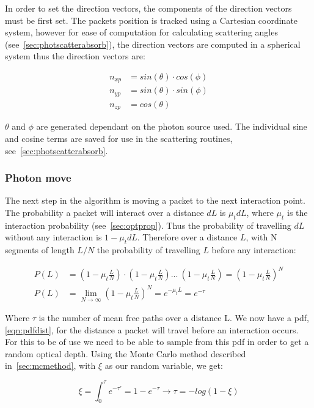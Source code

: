 In order to set the direction vectors, the components of the direction vectors must be first set. The packets position is tracked using a Cartesian coordinate system, however for ease of computation for calculating scattering angles (see~\cref{sec:photscatterabsorb}), the direction vectors are computed in a spherical system thus the direction vectors are: 

\begin{align}
n_{xp} &= sin(\theta) \cdot cos(\phi) \\
n_{yp} &= sin(\theta) \cdot sin(\phi) \\
n_{zp} &= cos(\theta)
\end{align}

$\theta$ and $\phi$ are generated dependant on the photon source used. The individual sine and cosine terms are saved for use in the scattering routines, see~\cref{sec:photscatterabsorb}.

\subsubsection{Photon move}\label{sec:photmove}

The next step in the algorithm is moving a packet to the next interaction point. The probability a packet will interact over a distance $dL$ is $\mu_tdL$, where $\mu_t$ is the interaction probability (see~\cref{sec:optprop}). Thus the probability of travelling $dL$ without any interaction is $1-\mu_tdL$. Therefore over a distance $L$, with N segments of length $L/N$ the probability of travelling $L$ before any interaction:

\begin{align}
P(L) &= (1-\mu_t\frac{L}{N}) \cdot (1-\mu_t\frac{L}{N}) ...\ (1-\mu_t\frac{L}{N}) = (1-\mu_t\frac{L}{N})^N \\
P(L) &= \lim_{N \to \infty}(1-\mu_t\frac{L}{N})^N=e^{-\mu_tL}=e^{-\tau}\label{eqn:pdfdist}
\end{align}

Where $\tau$ is the number of mean free paths over a distance L. We now have a \gls{pdf}, \cref{eqn:pdfdist}, for the distance a packet will travel before an interaction occurs. For this to be of use we need to be able to sample from this \gls{pdf} in order to get a random optical depth. Using the Monte Carlo method described in~\cref{sec:mcmethod}, with $\xi$ as our random variable, we get:

\begin{equation}
\xi=\int_{0}^{\tau}e^{-\tau'}=1-e^{-\tau}\rightarrow \tau=-log(1-\xi)
\end{equation}

